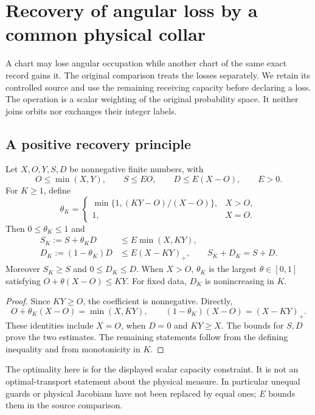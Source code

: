 \section{Recovery of angular loss by a common physical collar}
\label{sec:v71-pooled-collar}
A chart may lose angular occupation while another chart of the same
exact record gains it. The original comparison treats the losses
separately. We retain its controlled source and use the remaining
receiving capacity before declaring a loss. The operation is a scalar
weighting of the original probability space. It neither joins orbits
nor exchanges their integer labels.

\subsection{A positive recovery principle}
\begin{lemma}
\label{lem:v71-capacity-recovery}
Let $X,O,Y,S,D$ be nonnegative finite numbers, with
\[
 O\le\min(X,Y),\qquad S\le E O,\qquad D\le E(X-O),
 \qquad E>0.
\]
For $K\ge1$, define
\begin{equation}\label{eq:v71-recovery-coefficient}
 \theta_K=
 \begin{cases}
 \min\{1,(KY-O)/(X-O)\},&X>O,\\
 1,&X=O.
 \end{cases}
\end{equation}
Then $0\le\theta_K\le1$ and
\begin{align}
 S_K:=S+\theta_KD&\le E\min(X,KY),
                                      \label{eq:v71-capacity-controlled}\\
 D_K:=(1-\theta_K)D&\le E(X-KY)_+,
 \qquad S_K+D_K=S+D.                 \label{eq:v71-capacity-deficit}
\end{align}
Moreover $S_K\ge S$ and $0\le D_K\le D$. When $X>O$,
$\theta_K$ is the largest $\theta\in[0,1]$ satisfying
$O+\theta(X-O)\le KY$. For fixed data, $D_K$ is nonincreasing
in $K$.
\end{lemma}
\begin{proof}
Since $KY\ge O$, the coefficient is nonnegative. Directly,
\[
 O+\theta_K(X-O)=\min(X,KY),\qquad
 (1-\theta_K)(X-O)=(X-KY)_+.
\]
These identities include $X=O$, when $D=0$ and $KY\ge X$.
The bounds for $S,D$ prove the two estimates. The remaining statements
follow from the defining inequality and from monotonicity in $K$.
\end{proof}

The optimality here is for the displayed scalar capacity constraint.
It is not an optimal-transport statement about the physical measure.
In particular unequal guards or physical Jacobians have not been
replaced by equal ones; $E$ bounds them in the source comparison.

